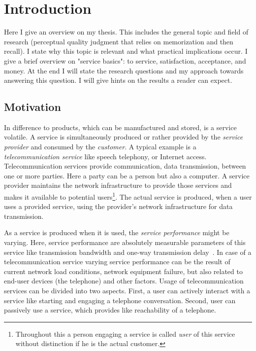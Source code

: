 \chapter{Introduction}\label{chap:01}
\begin{chapter-abstract}
Here I give an overview on my thesis.
This includes the general topic and field of research (perceptual quality judgment that relies on memorization and then recall).
I state why this topic is relevant and what practical implications occur.
I give a brief overview on "service basics": to service, satisfaction, acceptance, and money.
At the end I will state the research questions and my approach towards answering this question.
I will give hints on the results a reader can expect.
\end{chapter-abstract}


\section{Motivation}
In difference to products, which can be manufactured and stored, is a service volatile.
A service is simultaneously produced or rather provided by the \emph{service provider} and consumed by the \emph{customer}.
A typical example is a \emph{telecommunication service} like speech telephony, or Internet access.
Telecommunication services provide communication, \ie data transmission, between one or more parties.
Here a party can be a person but also a computer.
A service provider maintains the network infrastructure to provide those services and makes it available to potential users\footnote{Throughout this a person engaging a service is called \emph{user} of this service without distinction if he is the actual customer.}.
The actual service is produced, when a user uses a provided service, using the provider's network infrastructure for data transmission.

As a service is produced when it is used, the \emph{service performance} might be varying.
Here, service performance are absolutely measurable parameters of this service like transmission bandwidth and one-way transmission delay~\citep[\cf][p. 12]{moller_assessment_2000}.
In case of a telecommunication service varying service performance can be the result of current network load conditions, network equipment failure, but also related to end-user devices (\eg the telephone) and other factors.
Usage of telecommunication services can be divided into two aspects.
First, a user can actively interact with a service like starting and engaging a telephone conversation.
Second, user can passively use a service, which provides like reachability of a telephone.

